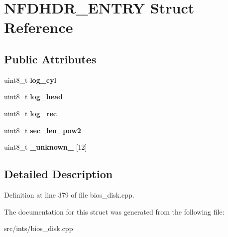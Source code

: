 \hypertarget{structNFDHDR__ENTRY}{\section{N\-F\-D\-H\-D\-R\-\_\-\-E\-N\-T\-R\-Y Struct Reference}
\label{structNFDHDR__ENTRY}
}
\subsection*{Public Attributes}
\begin{DoxyCompactItemize}
\item 
\hypertarget{structNFDHDR__ENTRY_ae8523f97410fceb29ed1e9e77da734fe}{uint8\-\_\-t {\bfseries log\-\_\-cyl}}\label{structNFDHDR__ENTRY_ae8523f97410fceb29ed1e9e77da734fe}

\item 
\hypertarget{structNFDHDR__ENTRY_a645482a87d18d9608411a31d1be81563}{uint8\-\_\-t {\bfseries log\-\_\-head}}\label{structNFDHDR__ENTRY_a645482a87d18d9608411a31d1be81563}

\item 
\hypertarget{structNFDHDR__ENTRY_a9dda4fb9e8157f373ccadc7477f943e1}{uint8\-\_\-t {\bfseries log\-\_\-rec}}\label{structNFDHDR__ENTRY_a9dda4fb9e8157f373ccadc7477f943e1}

\item 
\hypertarget{structNFDHDR__ENTRY_af8e66d7a81c5d458586ad0d4641ab21e}{uint8\-\_\-t {\bfseries sec\-\_\-len\-\_\-pow2}}\label{structNFDHDR__ENTRY_af8e66d7a81c5d458586ad0d4641ab21e}

\item 
\hypertarget{structNFDHDR__ENTRY_a2d28f97e845cdbea08e086a7f9b65b55}{uint8\-\_\-t {\bfseries \-\_\-unknown\-\_\-} \mbox{[}12\mbox{]}}\label{structNFDHDR__ENTRY_a2d28f97e845cdbea08e086a7f9b65b55}

\end{DoxyCompactItemize}


\subsection{Detailed Description}


Definition at line 379 of file bios\-\_\-disk.\-cpp.



The documentation for this struct was generated from the following file\-:\begin{DoxyCompactItemize}
\item 
src/ints/bios\-\_\-disk.\-cpp\end{DoxyCompactItemize}
